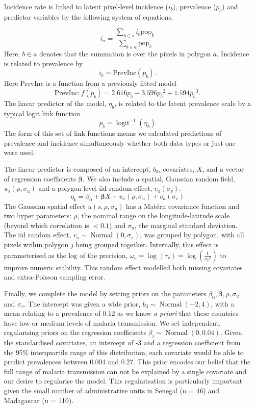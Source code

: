 \documentclass{statsoc}
\begin{document}
Incidence rate is linked to latent pixel-level incidence ($i_b$), prevalence ($p_b$) and predictor variables by the following system of equations.

$$i_a = \frac{ \sum_{b \in a}i_b \mathrm{pop}_b}{\sum_{b \in a}\mathrm{pop}_b} $$
Here, $b \in a$ denotes that the summation is over the pixels in polygon $a$. 
Incidence is related to prevalence by
$$i_b = \mathrm{PrevInc}(p_b).$$
Here $\mathrm{PrevInc}$ is a function from a previously fitted model \citep{cameron2015defining} 
$$\mathrm{PrevInc}: f\left(p_b\right) = 2.616p_b - 3.596{p_b}^2 + 1.594{p_b}^3.$$
The linear predictor of the model, $\eta_b$, is related to the latent prevalence scale by a typical logit link function.
$$p_b = \operatorname{logit}^{-1}(\eta_b)$$
The form of this set of link functions means we calculated predictions of prevalence and incidence simultaneously whether both data types or just one were used.

The linear predictor is composed of an intercept, $b_0$, covariates, $X$, and a vector of regression coefficients $\boldsymbol\beta$.
We also include a spatial, Gaussian random field, $u_s(\rho, \sigma_u)$ and a polygon-level iid random effect, $ v_a(\sigma_v)$.
$$\eta_b = \beta_0 + \boldsymbol\beta X  + u_s(\rho, \sigma_u) + v_a(\sigma_v) $$
The Gaussian spatial effect $u(s, \rho, \sigma_u)$ has a Mat\'ern covariance function and two hyper parameters: $\rho$, the nominal range on the longitude-latitude scale (beyond which correlation is $< 0.1$) and $\sigma_u$, the marginal standard deviation.
The iid random effect, $v_a \sim \operatorname{Normal}(0, \sigma_v)$,  was grouped by polygon, with all pixels within polygon $j$ being grouped together.
Internally, this effect is parameterised as the log of the precision, $\omega_v = \log(\tau_v) = \log(\frac{1}{{\sigma_v}^2})$ to improve numeric stability.
This random effect modelled both missing covariates and extra-Poisson sampling error.


Finally, we complete the model by setting priors on the parameters $\beta_0, \boldsymbol\beta, \rho, \sigma_u$ and $\sigma_v$.
The intercept was given a wide prior, $b_0 \sim \operatorname{Normal}(-2, 4)$, with a mean relating to a prevalence of 0.12 as we know \emph{a priori} that these countries have low or medium levels of malaria transmission.
We set independent, regularising priors on the regression coefficients $\beta_i \sim \operatorname{Normal}(0, 0.04)$. 
Given the standardised covariates, an intercept of -3 and a regression coefficient from the 95\% interquartile range of this distribution, each covariate would be able to predict prevalences between 0.004 and 0.27. 
This prior encodes our belief that the full range of malaria transmission can not be explained by a single covariate and our desire to regularise the model.
This regularisation is particularly important given the small number of administrative units in Senegal (n = 46) and Madagascar (n = 110).
\end{document}

